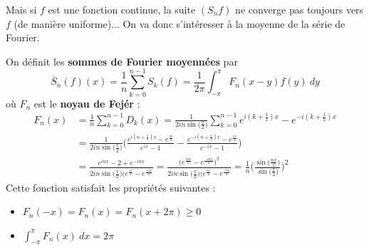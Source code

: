 Mais si $f$ est une fonction continue, la suite $(S_nf)$ ne converge pas toujours vers $f$ (de manière uniforme)... On va donc s'intéresser à la moyenne de la série de Fourier.

\begin{definition}
    On définit les \textbf{sommes de Fourier moyennées} par
    \begin{equation*}
        \overline{S}_n(f)(x)=\frac{1}{n}\sum_{k=0}^{n-1}S_k(f) = \frac{1}{2\pi}\int_{-\pi}^\pi F_n(x-y)f(y)\ dy
    \end{equation*}
    où $F_n$ est le \textbf{noyau de Fejér} :
    \begin{align*}
        F_n(x) &= \frac{1}{n} \sum_{k=0}^{n-1}D_k(x)
        = \frac{1}{2in\sin\big(\frac{x}{2}\big)}\sum_{k=0}^{n-1}e^{i(k+\frac{1}{2})x}-e^{-i(k+\frac{1}{2})x}\\
        & = \frac{1}{2in\sin\big(\frac{x}{2}\big)} \Bigg(\frac{e^{i(n+\frac{1}{2})x}-e^{\frac{ix}{2}}}{e^{ix}-1}-\frac{e^{-i(n+\frac{1}{2})x}-e^{\frac{ix}{2}}}{e^{-ix}-1}\Bigg)\\
        & = \frac{e^{inx}-2+e^{-inx}}{2in\sin\big(\frac{x}{2}\big)(e^{\frac{ix}{2}}-e^{\frac{-ix}{2}}} = \frac{\big(e^{\frac{inx}{2}}-e^{\frac{-inx}{2}}\big)^2}{2in\sin\big(\frac{x}{2}\big)(e^{\frac{ix}{2}}-e^{\frac{-ix}{2}}}
        = \frac{1}{n}\Bigg(\frac{\sin\big(\frac{nx}{2}\big)}{\sin\big(\frac{x}{2}\big)}\Bigg)^2
    \end{align*}
    Cette fonction satisfait les propriétés suivantes :
    \begin{itemize}
        \item $F_n(-x)=F_n(x)=F_n(x+2\pi)\geq0$
        \item $\int_{-\pi}^\pi F_n(x)\ dx = 2\pi$
    \end{itemize}
\end{definition}

